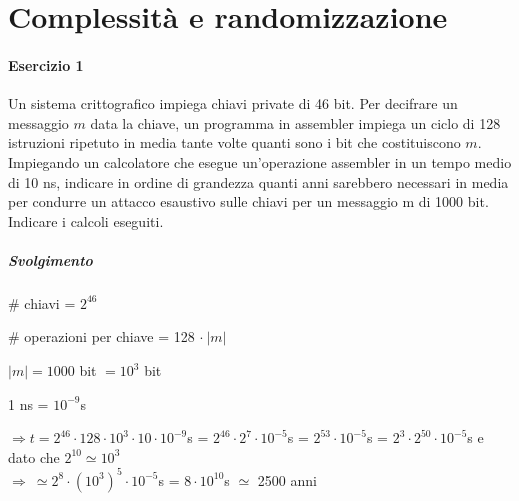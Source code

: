 \documentclass[10pt]{book}
\begin{document}
\section{Complessità e randomizzazione}
\paragraph{Esercizio 1} Un sistema crittografico impiega chiavi private di 46 bit. Per decifrare un messaggio $m$ data la
chiave, un programma in assembler impiega un ciclo di 128 istruzioni ripetuto in media tante volte
quanti sono i bit che costituiscono $m$. Impiegando un calcolatore che esegue un'operazione
assembler in un tempo medio di 10 ns, indicare in ordine di grandezza quanti anni sarebbero
necessari in media per condurre un attacco esaustivo sulle chiavi per un messaggio m di 1000 bit.\\
Indicare i calcoli eseguiti.
\subparagraph{Svolgimento} \begin{list}{}{}
	\item \# chiavi = $2^{46}$
	\item \# operazioni per chiave = 128 $\cdot\:|m|$
	\item $|m| = 1000$ bit $= 10^3$ bit
	\item 1 ns = $10^{-9}$s
	\item $\Rightarrow t = 2^{46}\cdot128\cdot10^3\cdot10\cdot10^{-9}$s = $2^{46}\cdot2^7\cdot10^{-5}$s = $2^{53}\cdot10^{-5}$s = $2^3\cdot2^{50}\cdot10^{-5}$s e dato che $2^{10} \simeq 10^3$\\
	$\Rightarrow\:\simeq 2^8\cdot(10^3)^5\cdot10^{-5}$s = $8\cdot10^{10}$s $\simeq$ 2500 anni
\end{list}
\end{document}
